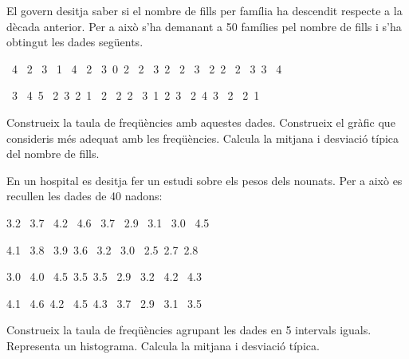 \begin{mylist}


\exer[1]  El govern desitja saber si el nombre de fills per família ha descendit respecte a la dècada anterior. Per a això s'ha demanant a 50 famílies pel nombre de fills i s'ha obtingut les dades següents. 
 
   \, 4 \, 2 \, 3 \, 1	  \, 4 \, 2 \, 3  \,0   \,2 \, 2 \, 3  \,2   \, 2 \, 3 \, 2\,  2	 \, 2 \, 3  \,3 \, 4 	\par
   \, 3 \, 4  \,5 \, 2	   \,3   \,2  \,1 \, 2   \, 2\,  2 \, 3  \,1    \,2  \,3 \, 2  \,4 	  \,3 \, 2 \, 2\,  1
 

\begin{tasks}
\task  Construeix la taula de freqüències amb aquestes dades. 
\task  Construeix el gràfic que consideris més adequat amb les freqüències.
\task  Calcula la mitjana i desviació típica del nombre de fills.
\end{tasks}
 
 
 
 
\exer[1] En un hospital es desitja fer un estudi sobre els pesos dels nounats. Per a això es recullen les dades de 40 nadons:

\pagebreak
 
 \begin{center}
 3.2  \, 3.7 \,  4.2 \,  4.6  \, 3.7  \,  2.9 \,  3.1 \,  3.0  \, 4.5  \par 4.1  \, 3.8 \,  3.9\,   3.6 \,  3.2   \,  3.0 \,  2.5\,   2.7\,    2.8 \par  3.0  \, 4.0 \,  4.5\,   3.5\,   3.5    \, 2.9 \,  3.2 \,  4.2 \,  4.3 \par 4.1  \, 4.6\,   4.2 \,  4.5\,   4.3  \,  3.7  \, 2.9 \,  3.1 \,  3.5 
\end{center}

\begin{tasks}
\task Construeix la taula de freqüències agrupant les dades en 5 intervals iguals.
\task Representa un histograma.
\task Calcula la mitjana i desviació típica. 
\end{tasks}


\end{mylist}

